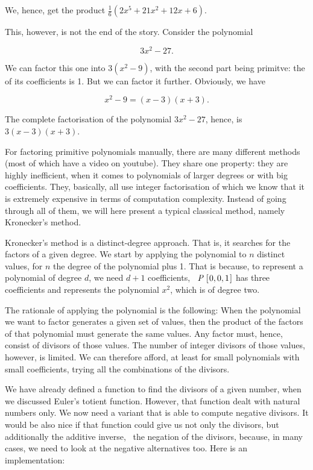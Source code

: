 \documentclass[tikz]{scrreprt}
\newcommand{\Conid}[1]{\mathit{#1}}
\begin{document}
We, hence, get the product
$\frac{1}{6}(2x^5 + 21x^2 + 12x + 6)$.

This, however, is not the end of the story.
Consider the polynomial 

\[
3x^2 - 27.
\]

We can factor this one into
$3(x^2 - 9)$, with the second part being
primitve: the  of its coefficients
is 1. But we can factor it further.
Obviously, we have

\begin{equation}
x^2 - 9 = (x - 3)(x + 3).
\end{equation}

The complete factorisation of the polynomial
$3x^2 - 27$, hence, is $3(x-3)(x+3)$.

For factoring primitive polynomials manually, there
are many different methods (most of which have a
video on youtube). They share one property:
they are highly inefficient, when it comes
to polynomials of larger degrees or with big
coefficients. They, basically, all use integer
factorisation of which we know that it is extremely
expensive in terms of computation complexity.
Instead of going through all of them, we will here
present a typical classical method, namely Kronecker's
method.

Kronecker's method is a distinct-degree approach. 
That is, it searches for the factors of a given degree.
We start by applying the polynomial to $n$ distinct values,
for $n$ the degree of the polynomial plus 1.
That is because, to represent a polynomial of degree $d$,
we need $d+1$ coefficients, \eg\ \ensuremath{\Conid{P}\;[\mskip1.5mu \mathrm{0},\mathrm{0},\mathrm{1}\mskip1.5mu]} has three
coefficients and represents the polynomial $x^2$, which is
of degree two.

The rationale of applying the polynomial is the following:
When the polynomial we want to factor generates
a given set of values, then the product of the factors
of that polynomial must generate the same values.
Any factor must, hence, consist of divisors of those values. 
The number of integer divisors
of those values, however, is limited.
We can therefore afford, at least for small polynomials
with small coefficients, trying all the combinations
of the divisors.

We have already defined a function
to find the divisors of a given number,
when we discussed Euler's totient function.
However, that function dealt with natural numbers
only. We now need a variant that is able to
compute negative divisors.
It would be also nice if that function
could give us not only the divisors,
but additionally the additive inverse,
\ie\ the negation of the divisors, because,
in many cases, we need to look at the negative
alternatives too. Here is an implementation:
\end{document}
